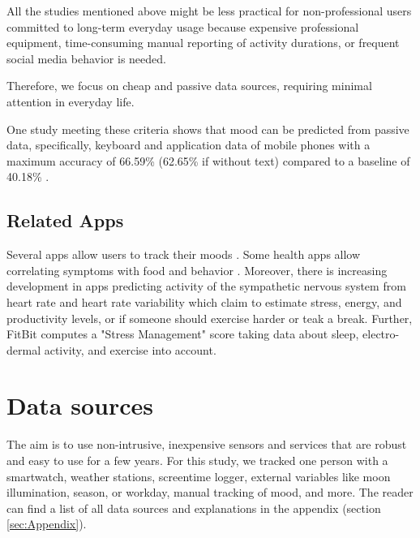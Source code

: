 \documentclass[conference]{IEEEtran}
\begin{document}
All the studies mentioned above might be less practical for non-professional users committed to long-term everyday usage because expensive professional equipment, time-consuming manual reporting of activity durations, or frequent social media behavior is needed.

Therefore, we focus on cheap and passive data sources, requiring minimal attention in everyday life.

One study meeting these criteria shows that mood can be predicted from passive data, specifically, keyboard and application data of mobile phones with a maximum accuracy of 66.59\% (62.65\% if without text) compared to a baseline of 40.18\% \cite{liu_multimodal_2020}.\\


\subsection{Related Apps}
\label{sec:apps}

Several apps allow users to track their moods  \cite{noauthor_moodprism_nodate}\cite{noauthor_moodily_nodate} \cite{noauthor_moodpanda_nodate}\cite{noauthor_daylio_nodate} \cite{noauthor_mood_nodate}\cite{noauthor_mood_nodate-1}\cite{fitbit_stress_nodate} \cite{appleinc_ios_nodate}\cite{hellocodeinc_exist_nodate}.
Some health apps allow correlating symptoms with food and behavior \cite{noauthor_pattern_nodate}\cite{noauthor_features_nodate}.
Moreover, there is increasing development in apps predicting activity of the sympathetic nervous system from heart rate and heart rate variability \cite{welltory_welltory_nodate}\cite{elitehrv_best_nodate} which claim to estimate stress, energy, and productivity levels\cite{welltory_welltory_nodate}, or if someone should exercise harder or teak a break\cite{elitehrv_best_nodate}.
Further, FitBit computes a "Stress Management" score taking data about sleep, electro-dermal activity, and exercise into account\cite{fitbit_stress_nodate}.


\section{Data sources}
The aim is to use non-intrusive, inexpensive sensors and services that are robust and easy to use for a few years.
For this study, we tracked one person with a smartwatch, weather stations, screentime logger, external variables like moon illumination, season, or workday, manual tracking of mood, and more.
The reader can find a list of all data sources and explanations in the appendix (section \ref{sec:Appendix}).
\end{document}
